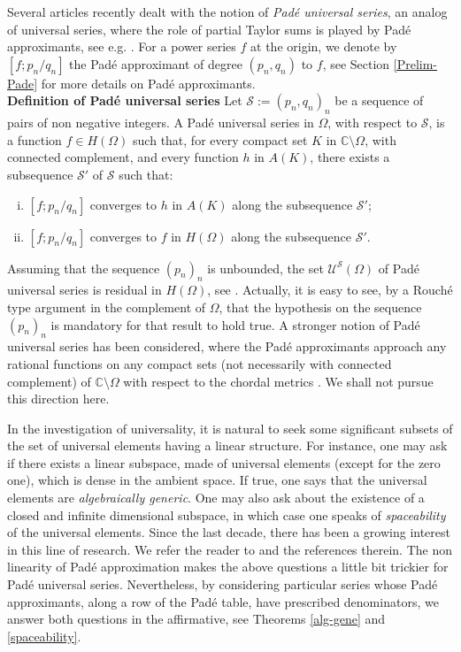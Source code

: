 \documentclass[12pt]{amsart}
\numberwithin{equation}{section}
\begin{document}
Several articles recently dealt with the notion of \emph{Pad\'e universal series}, an analog of universal series, where the role of partial Taylor sums is played by Pad\'e approximants, see e.g. \cite{DFN,FNes,Nes3}. For a power series $f$ at the origin, we denote by $[f;p_{n}/q_{n}]$ the Pad\'e approximant of degree $(p_{n},q_{n})$ to $f$, see Section \ref{Prelim-Pade} for more details on Pad\'e approximants.
\\[\baselineskip]
{\bf Definition of Pad\'e universal series }
Let ${\mathcal S} :=\left(p_n,q_n\right)_n$ be a sequence of pairs of non negative integers. A Pad\'e universal series in $\Omega$, with respect to ${\mathcal S}$, is a function $f\in H(\Omega)$ such that, for every compact set $K$ in ${\mathbb{C}} \setminus \Omega$, with connected complement, and every function $h$ in $A(K)$, there exists a subsequence ${\mathcal S}'$ of ${\mathcal S}$ such that:
\begin{enumerate}[i)]
\item $[f;p_{n}/q_{n}]$ converges to $h$ in $A(K)$ along the subsequence ${\mathcal S}'$;
\item $[f;p_{n}/q_{n}]$ converges to $f$ in $H(\Omega)$ along the subsequence ${\mathcal S}'$.
\end{enumerate}
Assuming that the sequence $(p_{n})_{n}$ is unbounded, the set
${\mathcal U} ^{\mathcal S}(\Omega)$ of Pad\'e universal series is residual in $H(\Omega)$, see
\cite[Theorem 3.1]{DFN}. Actually, it is easy to see, by a Rouch\'e type argument in the complement of $\Omega$, that the hypothesis on the sequence $(p_{n})_{n}$ is mandatory for that result to hold true.
A stronger notion of Pad\'e universal series has been considered, where the Pad\'e approximants approach any rational functions on any compact sets (not necessarily with connected complement) of ${\mathbb{C}}\setminus\Omega$ with respect to the chordal metrics \cite{Nes3}. We shall not pursue this direction here.

In the investigation of universality, it is natural to seek some significant subsets of the set of universal elements having a linear structure. For instance, one may ask if there exists a linear subspace, made of universal elements (except for the zero one), which is dense in the ambient space. If true, one says that the universal elements are {\it algebraically generic}. One may also ask about the existence of a closed and infinite dimensional subspace, in which case one speaks of {\it spaceability} of the universal elements. Since the last decade, there has been a growing interest in this line of research. We refer the reader to \cite{Aron1,Aron2,Bay0,BO,BPS,G-E,Montes,Men2} and the references therein. The non linearity of Pad\'e approximation makes the above questions a little bit trickier for Pad\'e universal series. 
Nevertheless, by considering particular series whose Pad\'e approximants, along a row of the Pad\'e table, have prescribed denominators, we answer both questions in the affirmative, see Theorems \ref{alg-gene} and \ref{spaceability}.
\end{document}
